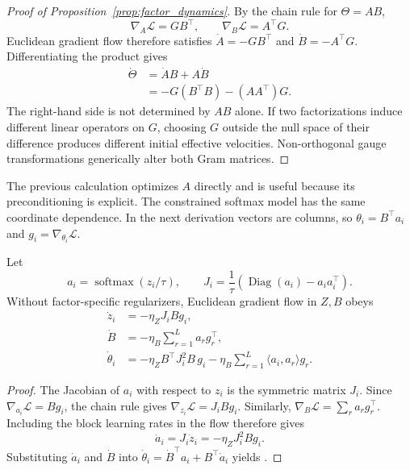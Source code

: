 \begin{proof}[Proof of Proposition~\ref{prop:factor_dynamics}]
By the chain rule for $\Theta=AB$,
\begin{equation}
 \nabla_A\mathcal L=GB^\top,
 \qquad
 \nabla_B\mathcal L=A^\top G.
\end{equation}
Euclidean gradient flow therefore satisfies
$\dot A=-GB^\top$ and $\dot B=-A^\top G$.  Differentiating the product gives
\begin{align}
 \dot\Theta
 &=\dot A B+A\dot B\\
 &=-G(B^\top B)-(AA^\top)G.
\end{align}
The right-hand side is not determined by $AB$ alone.  If two factorizations
induce different linear operators on $G$, choosing $G$ outside the null space
of their difference produces different initial effective velocities.
Non-orthogonal gauge transformations generically alter both Gram matrices.
\end{proof}

The previous calculation optimizes $A$ directly and is useful because its
preconditioning is explicit.  The constrained softmax model has the same
coordinate dependence.  In the next derivation vectors are columns, so
$\theta_i=B^\top a_i$ and $g_i=\nabla_{\theta_i}\mathcal L$.

\begin{proposition}
\label{prop:app_softmax_dynamics}
Let
\begin{equation}
 a_i=\operatorname{softmax}(z_i/\tau),
 \qquad
 J_i=\frac1\tau
 \left(\operatorname{Diag}(a_i)-a_i a_i^\top\right).
\end{equation}
Without factor-specific regularizers, Euclidean gradient flow in $Z,B$ obeys
\begin{align}
 \dot z_i&=-\eta_ZJ_iBg_i,\\
 \dot B&=-\eta_B\sum_{r=1}^L a_rg_r^\top,\\
 \dot\theta_i
 &=-\eta_ZB^\top J_i^2B\,g_i
   -\eta_B\sum_{r=1}^L\langle a_i,a_r\rangle g_r.
 \label{eq:app_softmax_flow}
\end{align}
\end{proposition}

\begin{proof}
The Jacobian of $a_i$ with respect to $z_i$ is the symmetric matrix $J_i$.
Since $\nabla_{a_i}\mathcal L=Bg_i$, the chain rule gives
$\nabla_{z_i}\mathcal L=J_iBg_i$.  Similarly,
$\nabla_B\mathcal L=\sum_r a_rg_r^\top$.  Including the block learning
rates in the flow therefore gives
\begin{equation}
 \dot a_i=J_i\dot z_i=-\eta_ZJ_i^2Bg_i.
\end{equation}
Substituting $\dot a_i$ and $\dot B$ into
$\dot\theta_i=\dot B^\top a_i+B^\top\dot a_i$ yields
.
\end{proof}

